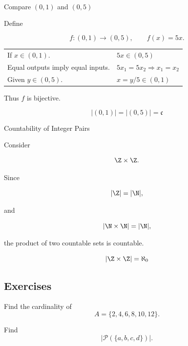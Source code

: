 \begin{workedexamplebox}{Compare \((0,1)\) and \((0,5)\)}

Define

\[ f:(0,1)\to(0,5),\qquad f(x)=5x. \]

\begin{tabularx}{\textwidth}{@{}>{\raggedright\arraybackslash}p{}X@{}}
If \(x\in(0,1)\). & \(5x\in(0,5)\)\\
Equal outputs imply equal inputs. & \(5x_1=5x_2\Rightarrow x_1=x_2\)\\
Given \(y\in(0,5)\). & \(x=y/5\in(0,1)\)
\end{tabularx}

Thus \(f\) is bijective.

\begin{answerbox}
\[ |(0,1)|=|(0,5)|=\mathfrak c \]
\end{answerbox}
\end{workedexamplebox}

\begin{workedexamplebox}{Countability of Integer Pairs}

Consider

\[ \Z\times\Z. \]

Since

\[ |\Z|=|\N|, \]

and

\[ |\N\times\N|=|\N|, \]

the product of two countable sets is countable.

\begin{answerbox}
\[ |\Z\times\Z|=\aleph_0 \]
\end{answerbox}
\end{workedexamplebox}

\subsection{Exercises}
\label{subsec:cardinality-exercises}

\begin{exercise}[1]
Find the cardinality of
\[ A=\{2,4,6,8,10,12\}. \]
\end{exercise}

\begin{exercise}[1]
Find
\[ |\mathcal P(\{a,b,c,d\})|. \]
\end{exercise}

